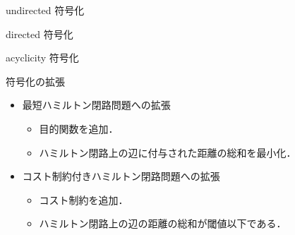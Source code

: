 \documentclass[dvipdfmx,10pt]{beamer}
\begin{document}
\begin{frame}[noframenumbering]{\textsf{undirected} 符号化}



\end{frame}

\begin{frame}[noframenumbering]{\textsf{directed} 符号化}



\end{frame}

\begin{frame}[noframenumbering]{\textsf{acyclicity} 符号化}



\end{frame}

\begin{frame}[noframenumbering]{符号化の拡張}
  






  \begin{itemize}
  \item 最短ハミルトン閉路問題への拡張
    \begin{itemize}
    \item 目的関数を追加．
    \item ハミルトン閉路上の辺に付与された距離の総和を最小化．
    \end{itemize}
  \item コスト制約付きハミルトン閉路問題への拡張
    \begin{itemize}
    \item コスト制約を追加．
    \item ハミルトン閉路上の辺の距離の総和が閾値以下である．
    \end{itemize}
  \end{itemize}
\end{frame}
\end{document}
